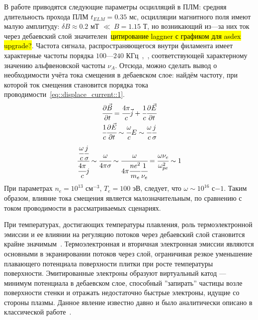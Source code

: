 В работе \cite{spolaore2017electromagnetic} приводятся следующие параметры
осцилляций в ПЛМ: средняя длительность прохода ПЛМ $t_{ELM} = 0.35$ мс, осцилляции магнитного поля
имеют малую амплитуду: $\delta B \approx 0.2$ мТ $\ll~B = 1.15$ Т, но
возникающий из---за них ток через дебаевский слой
значителен~\hl{цитирование laggner с графиком для asdex upgrade?}. Частота сигнала,
распространяющегося внутри филамента имеет характерные частоты порядка
$100$---$240$ КГц~\cite{spolaore2017electromagnetic},~\cite{laggner2016high}, соответствующей характерному
значению альфвеновской частоты $\nu_A$. Отсюда, можно сделать вывод о
необходимости учёта тока смещения в дебаевском слое: найдём частоту, при которой
ток смещения становится порядка тока
проводимости~\eqref{eq::displace_current::1}.
\begin{gather}
    \cfrac{\partial \vec{B}}{\partial t} = \cfrac{4\pi}{c}\vec{j} +
    \cfrac{1}{c}\cfrac{\partial \vec{E}}{\partial t}\\
    \cfrac{1}{c}\cfrac{\partial \vec{E}}{\partial t} \sim \cfrac{\omega}{c}E
    \sim \cfrac{\omega}{c}\cfrac{j}{\sigma}
    \label{eq::displace_current::1}
\end{gather}
\begin{equation}
    \cfrac{\cfrac{\omega}{c}\cfrac{j}{\sigma}}
    {\cfrac{4\pi}{c}j}
    \sim \cfrac{\omega}{4\pi\sigma} 
    \sim \cfrac{\omega}{4\pi\cfrac{ne^2}{m_e}\cfrac{1}{\nu_e}}
    = \cfrac{\omega \nu_e}{\omega_{pe}^2} \sim 1
    \label{eq::displace_current::2}
\end{equation}
При параметрах $n_e = 10^{13}$ см$^{-3}$, $T_e = 100$ эВ, следует, что $\omega
\sim 10^{16}$ с${-1}$. Таким образом, влияние тока смещения является малозначительным,
по сравнению с током проводимости в рассматриваемых сценариях.

При температурах, достигающих температуры плавления, роль термоэлектронной
эмиссии и ее влиянии на регуляцию потоков через дебаевский слой становится
крайне значимым~\cite{takamura1998heat}. Термоэлектронная и вторичная
электронная эмиссии являются основными в экранировании потоков через слой,
ограничивая резкое уменьшение плавающего потенциала поверхности плитки при росте
температуры поверхности. Эмитированные электроны образуют виртуальный катод ---
минимум потенциала в дебаевском слое, способный ''запирать'' частицы возле
поверхности стенки и отражать недостаточно быстрые электроны, идущие со стороны
плазмы. Данное явление известно давно и было аналитически описано в классической
работе~\cite{langmuir1913effect}. 

